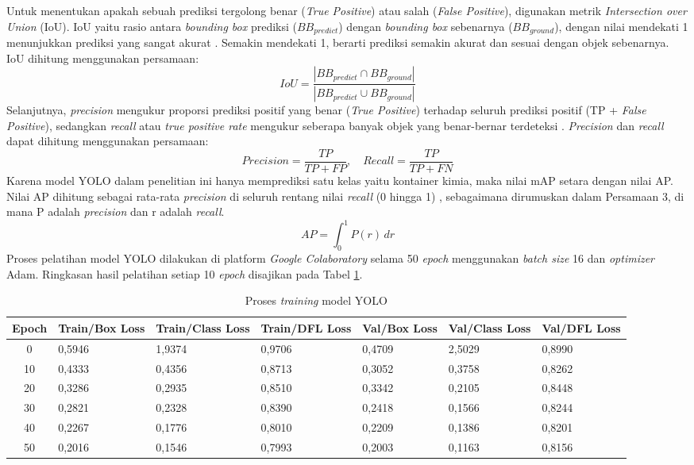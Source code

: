 Untuk menentukan apakah sebuah prediksi tergolong benar (\textit{True
Positive}) atau salah (\textit{False Positive}), digunakan metrik
\textit{Intersection over Union} (IoU). IoU yaitu rasio antara
\textit{bounding box} prediksi ($BB_{predict}$) dengan
\textit{bounding box} sebenarnya ($BB_{ground}$), dengan nilai
mendekati 1 menunjukkan prediksi yang sangat akurat \citep{22}.
Semakin mendekati 1, berarti prediksi semakin akurat dan sesuai
dengan objek sebenarnya. IoU dihitung menggunakan persamaan:
\begin{equation}
  IoU = \frac{|BB_{predict} \cap
  BB_{ground}|}{|BB_{predict} \cup BB_{ground}|}
\end{equation}
\indent
Selanjutnya, \textit{precision} mengukur proporsi prediksi positif
yang benar (\textit{True Positive}) terhadap seluruh prediksi positif
(TP + \textit{False Positive}), sedangkan \textit{recall} atau
\textit{true positive rate} mengukur seberapa banyak objek yang
benar-bernar terdeteksi \citep{23}. \textit{Precision} dan
\textit{recall} dapat dihitung menggunakan persamaan:
\begin{equation}
  Precision = \frac{TP}{TP + FP}, \quad
  Recall = \frac{TP}{TP + FN}
\end{equation}
\indent
Karena model YOLO dalam penelitian ini hanya memprediksi satu kelas
yaitu kontainer kimia, maka nilai mAP setara dengan nilai AP. Nilai
AP dihitung sebagai rata-rata \textit{precision} di seluruh rentang nilai
\textit{recall} (0 hingga 1) \citep{24}, sebagaimana dirumuskan dalam
Persamaan 3, di mana P adalah \textit{precision} dan r adalah \textit{recall}.
\begin{equation}
  AP = \int_{0}^{1} P(r) \,dr
\end{equation}
\indent
Proses pelatihan model YOLO dilakukan di platform \textit{Google
Colaboratory} selama 50 \textit{epoch} menggunakan \textit{batch
size} 16 dan \textit{optimizer} Adam. Ringkasan hasil pelatihan
setiap 10 \textit{epoch} disajikan pada Tabel \ref{tab:yolo-train}.
\begin{table}[H]
  \caption{Proses \textit{training} model YOLO}
  \label{tab:yolo-train}
  \vspace{-1em}
  \centering
  \small
  \begin{tabular}{c p{1.5cm} p{1.5cm} p{1.5cm} p{1.5cm} p{1.5cm} p{1.5cm}}
    \toprule
    \textbf{Epoch} & \textbf{Train/Box Loss} & \textbf{Train/Class Loss}
    & \textbf{Train/DFL Loss} & \textbf{Val/Box Loss}
    & \textbf{Val/Class Loss} & \textbf{Val/DFL Loss} \\
    \midrule
    0  & 0,5946 & 1,9374 & 0,9706 & 0,4709 & 2,5029 & 0,8990 \\
    10 & 0,4333 & 0,4356 & 0,8713 & 0,3052 & 0,3758 & 0,8262 \\
    20 & 0,3286 & 0,2935 & 0,8510 & 0,3342 & 0,2105 & 0,8448 \\
    30 & 0,2821 & 0,2328 & 0,8390 & 0,2418 & 0,1566 & 0,8244 \\
    40 & 0,2267 & 0,1776 & 0,8010 & 0,2209 & 0,1386 & 0,8201 \\
    50 & 0,2016 & 0,1546 & 0,7993 & 0,2003 & 0,1163 & 0,8156 \\
    \bottomrule
  \end{tabular}
  \normalsize
\end{table}
